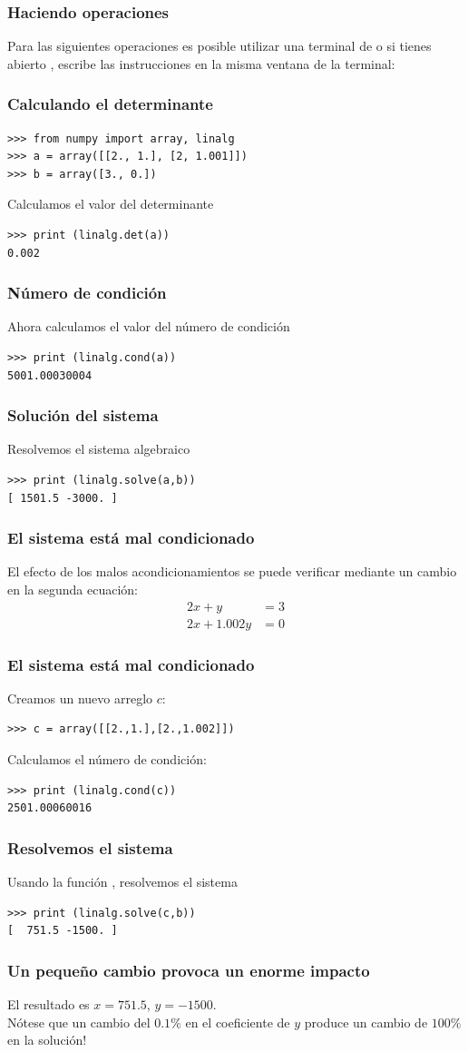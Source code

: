 \begin{frame}
\frametitle{Haciendo operaciones}
Para las siguientes operaciones es posible utilizar una terminal de  o si tienes abierto , escribe las instrucciones en la misma ventana de la terminal:
\end{frame}
\begin{frame}[fragile]
\frametitle{Calculando el determinante}
\begin{verbatim}
>>> from numpy import array, linalg
>>> a = array([[2., 1.], [2, 1.001]])
>>> b = array([3., 0.])
\end{verbatim}
\pause
Calculamos el valor del determinante
\begin{verbatim}
>>> print (linalg.det(a))
0.002
\end{verbatim}
\end{frame}
\begin{frame}[fragile]
\frametitle{Número de condición}
Ahora calculamos el valor del número de condición	
\begin{verbatim}
>>> print (linalg.cond(a))
5001.00030004
\end{verbatim}
\end{frame}
\begin{frame}[fragile]
\frametitle{Solución del sistema}
Resolvemos el sistema algebraico
\begin{verbatim}
>>> print (linalg.solve(a,b))
[ 1501.5 -3000. ]
\end{verbatim}
\end{frame}
\begin{frame}[fragile]
\frametitle{El sistema está mal condicionado}
El efecto de los malos acondicionamientos se puede verificar mediante un cambio en la segunda ecuación:
\[  \begin{split}
2x + y &= 3 \\
2x + 1.002y &= 0
\end{split} \]
\end{frame}
\begin{frame}[fragile]
\frametitle{El sistema está mal condicionado}
Creamos un nuevo arreglo $c$:
\begin{verbatim}
>>> c = array([[2.,1.],[2.,1.002]])
\end{verbatim}
\pause
Calculamos el número de condición:
\begin{verbatim}
>>> print (linalg.cond(c))
2501.00060016
\end{verbatim}
\end{frame}
\begin{frame}[fragile]
\frametitle{Resolvemos el sistema}
Usando la función , resolvemos el sistema
\begin{verbatim}
>>> print (linalg.solve(c,b))
[  751.5 -1500. ]
\end{verbatim}
\end{frame}
\begin{frame}
\frametitle{\large{Un pequeño cambio provoca un enorme impacto}}
El resultado es $x = 751.5$, $y = -1500$.
\\
\bigskip
Nótese que un cambio del $0.1\%$ en el coeficiente de $y$ produce un cambio de $100\%$ en la solución!
\end{frame}
